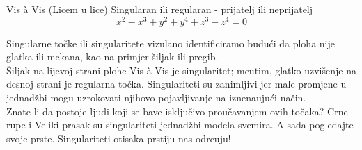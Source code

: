 \begin{surferPage}{Vis à Vis (Licem u lice)}
Singularan ili regularan - prijatelj ili neprijatelj\\
\smallskip
\[x^2	- x^3+ y^2+ y^4+ z^3- z^4	=  0\]

\vspace{0.3cm}
Singularne to\v{c}ke ili singularitete vizulano identificiramo budu\'{c}i da ploha nije glatka ili mekana, kao na primjer \v{s}iljak ili pregib. \\
\vspace{0.3cm}
\v{S}iljak na lijevoj strani plohe Vis \`a Vis je singularitet; me\dj{}utim, glatko uzvi\v{s}enje na desnoj strani je regularna to\v{c}ka. Singulariteti su zanimljivi jer male promjene u jednad\v{z}bi mogu uzrokovati njihovo pojavljivanje na iznena\dj{}uju\'{c}i na\v{c}in.\\
\vspace{0.3cm}
Znate li da postoje ljudi koji se bave isklju\v{c}ivo prou\v{c}avanjem ovih to\v{c}aka? Crne rupe i Veliki prasak su singulariteti jednad\v{z}bi modela svemira. A sada pogledajte svoje prste. Singulariteti otisaka prstiju nas odre\dj{}uju!
\end{surferPage}
